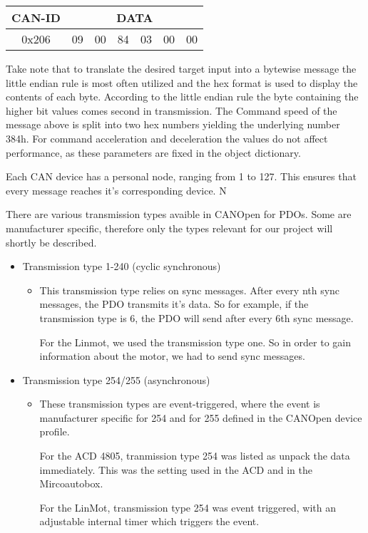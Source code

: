 \begin{tabular}{|c|c|c|c|c|c|c|}
	\hline 
	CAN-ID & \multicolumn{6}{c|}{DATA} \\ 
	\hline 
	0x206 & 09 & 00 & 84 & 03 & 00 & 00 \\ 
	\hline 
\end{tabular} 

Take note that to translate the desired target input into a bytewise message
the little endian rule is most often utilized and the hex format is used to display the contents of each byte. According to the little endian rule the byte containing the higher bit values comes second in transmission. 
The Command speed of the message above is split into two hex numbers yielding the underlying number 384h. For command acceleration and deceleration the values do not affect performance, as these parameters are fixed in the object dictionary.

\newpage

Each CAN device has a personal node, ranging from 1 to 127. This ensures that every message reaches it's corresponding device.
N


There are various transmission types avaible in CANOpen for PDOs. Some are manufacturer specific, therefore only the types relevant for our project will shortly be described.

\begin{itemize}

\item Transmission type 1-240 (cyclic synchronous)
\begin{itemize}
	\item This transmission type relies on sync messages. After every nth sync messages, the PDO transmits it's data. So for example, if the transmission type is 6, the PDO will send after every 6th sync message.
	
	For the Linmot, we used the transmission type one. So in order to gain information about the motor, we had to send sync messages.
	
\end{itemize}

\item {Transmission type 254/255 (asynchronous)}
\begin{itemize}
	\item These transmission types are event-triggered, where the event is manufacturer specific for 254 and for 255 defined in the CANOpen device profile.
	
	For the ACD 4805, tranmission type 254 was listed as unpack the data immediately. This was the setting used in the ACD and in the Mircoautobox.
	
	For the LinMot, transmission type 254 was event triggered, with an adjustable internal timer which triggers the event.
\end{itemize}

\end{itemize}


